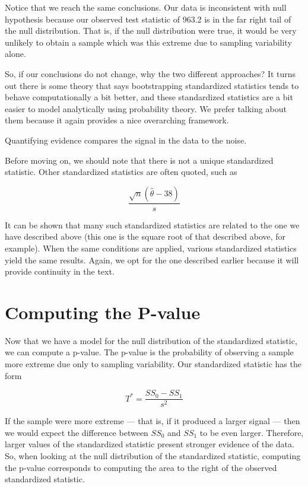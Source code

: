 \documentclass[
]{book}
\theoremstyle{plain}
\theoremstyle{mydefn}
\theoremstyle{myexmpl}
\theoremstyle{remark}
\begin{document}
Notice that we reach the same conclusions. Our data is inconsistent with null hypothesis because our observed test statistic of 963.2 is in the far right tail of the null distribution. That is, if the null distribution were true, it would be very unlikely to obtain a sample which was this extreme due to sampling variability alone.

So, if our conclusions do not change, why the two different approaches? It turns out there is some theory that says bootstrapping standardized statistics tends to behave computationally a bit better, and these standardized statistics are a bit easier to model analytically using probability theory. We prefer talking about them because it again provides a nice overarching framework.

\begin{rmdkeyidea}
Quantifying evidence compares the signal in the data to the noise.
\end{rmdkeyidea}

Before moving on, we should note that there is not a unique standardized statistic. Other standardized statistics are often quoted, such as

\[\frac{\sqrt{n}\left(\widehat{\theta} - 38\right)}{s}\]

It can be shown that many such standardized statistics are related to the one we have described above (this one is the square root of that described above, for example). When the same conditions are applied, various standardized statistics yield the same results. Again, we opt for the one described earlier because it will provide continuity in the text.

\hypertarget{computing-the-p-value}{%
\section{Computing the P-value}\label{computing-the-p-value}}

Now that we have a model for the null distribution of the standardized statistic, we can compute a p-value. The p-value is the probability of observing a sample more extreme due only to sampling variability. Our standardized statistic has the form

\[T^* = \frac{SS_0 - SS_1}{s^2}\]

If the sample were more extreme --- that is, if it produced a larger signal --- then we would expect the difference between \(SS_0\) and \(SS_1\) to be even larger. Therefore, larger values of the standardized statistic present stronger evidence of the data. So, when looking at the null distribution of the standardized statistic, computing the p-value corresponds to computing the area to the right of the observed standardized statistic.
\end{document}

